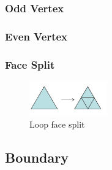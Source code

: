 \subsubsection*{Odd Vertex}

\subsubsection*{Even Vertex}

\subsubsection*{Face Split}


\begin{figure}
\centering
\includegraphics[width=0.3\textwidth]{content/media/sd_loop_split.png}
\caption{Loop face split \cite[S. 56f]{Standford.24.07.2015}}
\label{fig:sd_loop_split}
\end{figure}

\subsection{Boundary}

